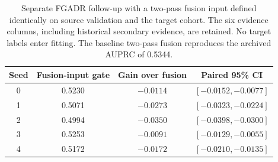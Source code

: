 \begin{table}[htbp]
\centering
\caption{Separate FGADR follow-up with a two-pass fusion input defined identically on source validation and the target cohort. The six evidence columns, including historical secondary evidence, are retained. No target labels enter fitting. The baseline two-pass fusion reproduces the archived AUPRC of 0.5344.}
\label{tab:fgadr_fusion_followup}
\footnotesize
\setlength{\tabcolsep}{3pt}
\begin{tabular}{cccc}
\toprule
Seed & Fusion-input gate & Gain over fusion & Paired 95\% CI \\
\midrule
0 & 0.5230 & $-0.0114$ & $[-0.0152, -0.0077]$ \\
1 & 0.5071 & $-0.0273$ & $[-0.0323, -0.0224]$ \\
2 & 0.4994 & $-0.0350$ & $[-0.0398, -0.0300]$ \\
3 & 0.5253 & $-0.0091$ & $[-0.0129, -0.0055]$ \\
4 & 0.5172 & $-0.0172$ & $[-0.0210, -0.0135]$ \\
\bottomrule
\end{tabular}
\par{}
\end{table}
